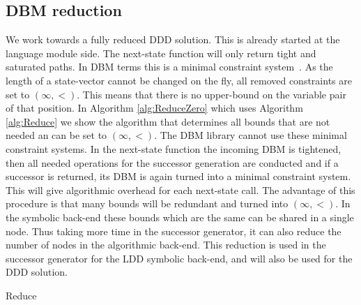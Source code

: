 \subsection{DBM reduction}
\label{subsection:dbm_reduction}
We work towards a fully reduced DDD solution. This is already started at the language module side. The next-state function will only return tight and saturated paths. In DBM terms this is a minimal constraint system~\cite{bengtsson2002clocks}. As the length of a state-vector cannot be changed on the fly, all removed constraints are set to $(\infty,<)$. This means that there is no upper-bound on the variable pair of that position. In Algorithm \ref{alg:ReduceZero} which uses Algorithm \ref{alg:Reduce} we show the algorithm that determines all bounds that are not needed an can be set to $(\infty,<)$. 
The DBM library cannot use these minimal constraint systems. In the next-state function the incoming DBM is tightened, then all needed operations for the successor generation are conducted and if a successor is returned, its DBM is again turned into a minimal constraint system. This will give algorithmic overhead for each next-state call. The advantage of this procedure is that many bounds will be redundant and turned into $(\infty,<)$. In the symbolic back-end these bounds which are the same can be shared in a single node. Thus taking more time in the successor generator, it can also reduce the number of nodes in the algorithmic back-end.
This reduction is used in the successor generator for the LDD symbolic back-end, and will also be used for the DDD solution.

\begin{algorithm}
\caption{Reduce}\label{alg:Reduce}
\begin{algorithmic}[1]
					\EndIf
				\EndIf
			\EndFor
		\EndFor
	\EndFor				
\EndProcedure
\end{algorithmic}
\end{algorithm}

